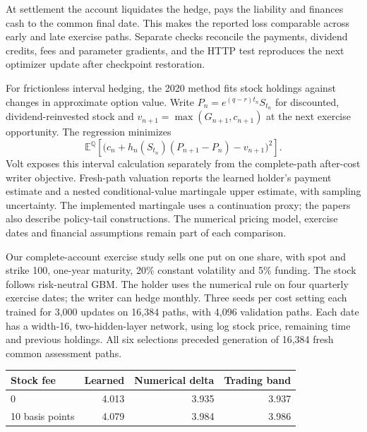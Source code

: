 \documentclass[8pt]{strategynet-journal}
\newcommand{\E}{\mathbb{E}}
\begin{document}
\begin{SNcolumns}
At settlement the account liquidates the hedge, pays the liability and
finances cash to the common final date. This makes the reported loss
comparable across early and late exercise paths. Separate checks reconcile
the payments, dividend credits, fees and parameter gradients, and the HTTP
test reproduces the next optimizer update after checkpoint restoration.

For frictionless interval hedging, the 2020 method fits stock holdings against
changes in approximate option value. Write
$P_n=e^{(q-r)t_n}S_{t_n}$ for discounted, dividend-reinvested stock and
$v_{n+1}=\max(G_{n+1},c_{n+1})$ at the next exercise opportunity.
The regression minimizes
\[
 \E^{\mathbb Q}\!\left[
   \bigl(c_n+h_n(S_{t_n})(P_{n+1}-P_n)-v_{n+1}\bigr)^2
 \right].
\]
Volt exposes this interval calculation separately from the complete-path
after-cost writer objective. Fresh-path valuation reports the learned
holder's payment estimate and a nested conditional-value martingale upper
estimate, with sampling uncertainty. The implemented martingale uses a
continuation proxy; the papers also describe policy-tail constructions.
The numerical pricing model, exercise dates and financial assumptions remain
part of each comparison.

Our complete-account exercise study sells one put on one share, with spot
and strike 100, one-year maturity, 20\% constant volatility and 5\% funding.
The stock follows risk-neutral GBM. The holder uses the numerical rule on
four quarterly exercise dates; the writer can hedge monthly. Three seeds
per cost setting each trained for 3,000 updates on 16,384 paths, with 4,096
validation paths. Each date has a width-16, two-hidden-layer network, using
log stock price, remaining time and previous holdings. All six selections
preceded generation of 16,384 fresh common assessment paths.

\begin{center}
\begin{minipage}{\linewidth}
\centering
\begin{tabular}{lrrr}
\toprule
Stock fee & Learned & Numerical delta & Trading band\\
\midrule
0 & 4.013 & 3.935 & 3.937\\
10 basis points & 4.079 & 3.984 & 3.986\\
\bottomrule
\end{tabular}
\end{minipage}
\end{center}


\end{SNcolumns}
\end{document}
